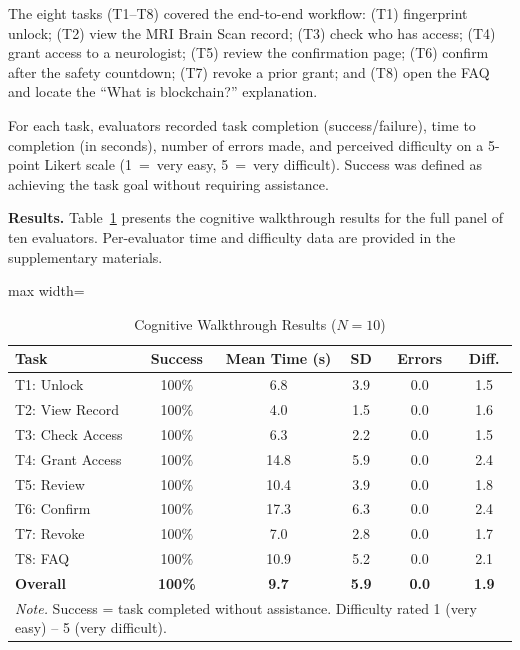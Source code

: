 \documentclass[journal,onecolumn]{IEEEtran}
\begin{document}
The eight tasks (T1--T8) covered the end-to-end workflow: (T1) fingerprint unlock; (T2) view the MRI Brain Scan record; (T3) check who has access; (T4) grant access to a neurologist; (T5) review the confirmation page; (T6) confirm after the safety countdown; (T7) revoke a prior grant; and (T8) open the FAQ and locate the ``What is blockchain?'' explanation.

For each task, evaluators recorded task completion (success/failure),
time to completion (in seconds), number of errors made, and perceived
difficulty on a 5-point Likert scale (1~=~very easy, 5~=~very difficult).
Success was defined as achieving the task goal without requiring
assistance.

\noindent\textbf{Results.} 
Table~\ref{tab:cognitive-walkthrough} presents the cognitive walkthrough
results for the full panel of ten evaluators. Per-evaluator time and difficulty data are provided in the supplementary materials.

\begin{table}[htbp]
\centering
\caption{Cognitive Walkthrough Results ($N=10$)}
\label{tab:cognitive-walkthrough}
\small
\begin{adjustbox}{max width=\columnwidth}
\begin{tabular}{|p{1.8cm}|c|c|c|c|c|}
\hline
\textbf{Task} & \textbf{Success} & \textbf{Mean Time (s)} & \textbf{SD} & \textbf{Errors} & \textbf{Diff.} \\
\hline
T1: Unlock & 100\% & 6.8 & 3.9 & 0.0 & 1.5 \\
\hline
T2: View Record & 100\% & 4.0 & 1.5 & 0.0 & 1.6 \\
\hline
T3: Check Access & 100\% & 6.3 & 2.2 & 0.0 & 1.5 \\
\hline
T4: Grant Access & 100\% & 14.8 & 5.9 & 0.0 & 2.4 \\
\hline
T5: Review & 100\% & 10.4 & 3.9 & 0.0 & 1.8 \\
\hline
T6: Confirm & 100\% & 17.3 & 6.3 & 0.0 & 2.4 \\
\hline
T7: Revoke & 100\% & 7.0 & 2.8 & 0.0 & 1.7 \\
\hline
T8: FAQ & 100\% & 10.9 & 5.2 & 0.0 & 2.1 \\
\hline
\textbf{Overall} & \textbf{100\%} & \textbf{9.7} & \textbf{5.9} & \textbf{0.0} & \textbf{1.9} \\
\hline
\multicolumn{6}{l}{\footnotesize\textit{Note.} Success = task completed without assistance. Difficulty rated 1 (very easy) -- 5 (very difficult).}
\end{tabular}
\end{adjustbox}
\end{table}
\end{document}
